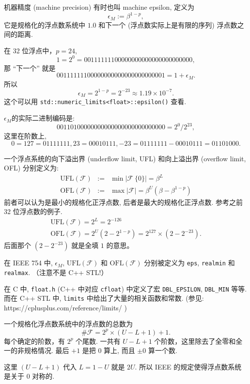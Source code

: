 \documentclass[a4paper]{ctexart}
\begin{document}
{ 机器精度 (machine precision) 有时也叫
machine epsilon, 定义为
$$
\epsilon_M := \beta^{1 - p},
$$
它是规格化的浮点数系统中 $1.0$ 和下一个 (浮点数实际上是有限的序列)
浮点数之间的距离.

在 32 位浮点中，$p = 24$,
$$
1 = 2^0 = 0 01111111 00000000000000000000000,
$$
那 ``下一个'' 就是
$$
0 01111111 00000000000000000000001 = 1 + \epsilon_M.
$$
所以
$$
\epsilon_M = 2^{1 - p} = 2^{-23} \approx 1.19 \times 10^{-7}.
$$
这个可以用 \verb|std::numeric_limits<float>::epsilon()| 查看.

$\epsilon_M$的实际二进制编码是:
$$
0 01101000 00000000000000000000000 = 2^0 / 2^{23}, 
$$
这里在阶数上,
$$
0 = 127 = 01111111, 23 = 00010111, -23 = 01111111 - 00010111 = 01101000.
$$

 一个浮点系统的向下溢出界 (underflow limit, UFL)
和向上溢出界 (overflow limit, OFL) 分别定义为:
$$
\begin{array}{rcl}
  \mbox{UFL}(\mathscr{F}) &:=& \min \left|\mathscr{F} \ \{0\} \right|
  = \beta^{L} \\
  \mbox{OFL}(\mathscr{F}) &:=& \max \left|\mathscr{F} \right|
  = \beta^{U}\left(\beta - \beta^{1 - p}\right) 
\end{array}
$$
前者可以认为是最小的规格化正浮点数, 后者是最大的规格化正浮点数. 参考之前 32 位浮点数的例子. 
$$
\begin{array}{rcl}
  \mbox{UFL}(\mathscr{F}) = 2^{L} = 2^{-126} \\
  \mbox{OFL}(\mathscr{F}) = 2^{U}(2 - 2^{1 - p}) = 2^{127} \times (2 - 2^{-23}).
\end{array} 
$$
后面那个 $(2 - 2^{-23})$ 就是全填 $1$ 的意思。

 在 IEEE 754 中, $\epsilon_M$,
$\mbox{UFL}(\mathscr{F})$ 和 $\mbox{OFL}(\mathscr{F})$ 分别被定义为
\verb|eps|, \verb|realmin| 和 \verb|realmax|. （注意不是 C++ STL!）

在 C 中, \verb|float.h| (C++ 中对应 \verb|cfloat|) 中定义了宏
\verb|DBL_EPSILON|, \verb|DBL_MIN| 等等. 而在 C++ STL 中,
\verb|limits| 中给出了大量的相关函数和常数.
(参见:\newline
https://cplusplus.com/reference/limits/
)

 一个规格化浮点数系统中的浮点数的总数为
$$
\#\mathscr{F} = 2^p \times (U - L + 1) + 1.
$$
每个确定的阶数，有 $2^p$ 个尾数. 一共有 $U - L + 1$ 个阶数，这里除去了全零和全一的非规格情况.
最后 $+1$ 是把 $0$ 算上, 而且 $\pm 0$ 算一个数.

这里 $(U - L + 1)$ 代入 $L = 1 - U$ 就是 $2 U$. 所以 IEEE 
的规定使得浮点数系统是关于 $0$ 对称的.

}
\end{document}
